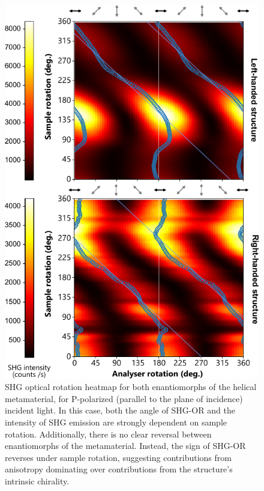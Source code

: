 \begin{figure}[htb!]	
    \centering	
    \includegraphics[scale=1]{./figures/results/OAinPlanarNanohelices/p_data.pdf}

    \caption{\label{fig:results:OAinPlanarNanohelices:p_data}
    SHG optical rotation heatmap for both enantiomorphs of the helical metamaterial, for P-polarized (parallel to the plane of incidence) incident light. In this case, both the angle of SHG-OR and the intensity of SHG emission are strongly dependent on sample rotation. Additionally, there is no clear reversal between enantiomorphs of the metamaterial. Instead, the sign of SHG-OR reverses under sample rotation, suggesting contributions from anisotropy dominating over contributions from the structure's intrinsic chirality.}	
\end{figure}

